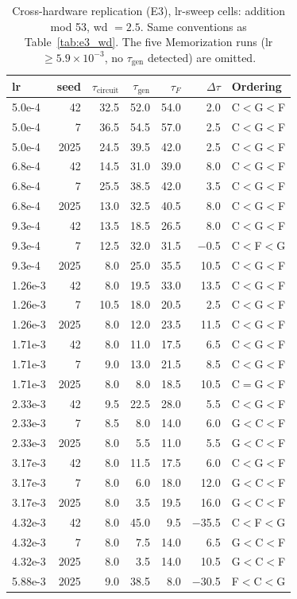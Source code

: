 \documentclass[12pt,openany,a4paper]{book}
\newcommand{\taug}{\tau_{\mathrm{gen}}}
\newcommand{\tauf}{\tau_{F}}
\newcommand{\taucirc}{\tau_{\mathrm{circuit}}}
\newcommand{\Dtau}{\Delta\tau}
\begin{document}
\begin{table}[htbp]
\centering
\caption{Cross-hardware replication (E3), lr-sweep cells: addition mod 53, wd $= 2.5$. Same conventions as Table~\ref{tab:e3_wd}. The five Memorization runs (lr $\geq 5.9\!\times\!10^{-3}$, no $\taug$ detected) are omitted.}
\label{tab:e3_lr}
\small
\begin{tabular}{lrrrrrl}
\toprule
lr & seed & $\taucirc$ & $\taug$ & $\tauf$ & $\Dtau$ & Ordering \\
\midrule
5.0e-4 & 42   & 32.5 & 52.0 & 54.0 & 2.0   & C$<$G$<$F \\
5.0e-4 & 7    & 36.5 & 54.5 & 57.0 & 2.5   & C$<$G$<$F \\
5.0e-4 & 2025 & 24.5 & 39.5 & 42.0 & 2.5   & C$<$G$<$F \\
6.8e-4 & 42   & 14.5 & 31.0 & 39.0 & 8.0   & C$<$G$<$F \\
6.8e-4 & 7    & 25.5 & 38.5 & 42.0 & 3.5   & C$<$G$<$F \\
6.8e-4 & 2025 & 13.0 & 32.5 & 40.5 & 8.0   & C$<$G$<$F \\
9.3e-4 & 42   & 13.5 & 18.5 & 26.5 & 8.0   & C$<$G$<$F \\
9.3e-4 & 7    & 12.5 & 32.0 & 31.5 & $-$0.5 & C$<$F$<$G \\
9.3e-4 & 2025 & 8.0  & 25.0 & 35.5 & 10.5  & C$<$G$<$F \\
1.26e-3 & 42   & 8.0  & 19.5 & 33.0 & 13.5  & C$<$G$<$F \\
1.26e-3 & 7    & 10.5 & 18.0 & 20.5 & 2.5   & C$<$G$<$F \\
1.26e-3 & 2025 & 8.0  & 12.0 & 23.5 & 11.5  & C$<$G$<$F \\
1.71e-3 & 42   & 8.0  & 11.0 & 17.5 & 6.5   & C$<$G$<$F \\
1.71e-3 & 7    & 9.0  & 13.0 & 21.5 & 8.5   & C$<$G$<$F \\
1.71e-3 & 2025 & 8.0  & 8.0  & 18.5 & 10.5  & C$=$G$<$F \\
2.33e-3 & 42   & 9.5  & 22.5 & 28.0 & 5.5   & C$<$G$<$F \\
2.33e-3 & 7    & 8.5  & 8.0  & 14.0 & 6.0   & G$<$C$<$F \\
2.33e-3 & 2025 & 8.0  & 5.5  & 11.0 & 5.5   & G$<$C$<$F \\
3.17e-3 & 42   & 8.0  & 11.5 & 17.5 & 6.0   & C$<$G$<$F \\
3.17e-3 & 7    & 8.0  & 6.0  & 18.0 & 12.0  & G$<$C$<$F \\
3.17e-3 & 2025 & 8.0  & 3.5  & 19.5 & 16.0  & G$<$C$<$F \\
4.32e-3 & 42   & 8.0  & 45.0 & 9.5  & $-$35.5 & C$<$F$<$G \\
4.32e-3 & 7    & 8.0  & 7.5  & 14.0 & 6.5   & G$<$C$<$F \\
4.32e-3 & 2025 & 8.0  & 3.5  & 14.0 & 10.5  & G$<$C$<$F \\
5.88e-3 & 2025 & 9.0  & 38.5 & 8.0  & $-$30.5 & F$<$C$<$G \\
\bottomrule
\end{tabular}
\end{table}
\end{document}
